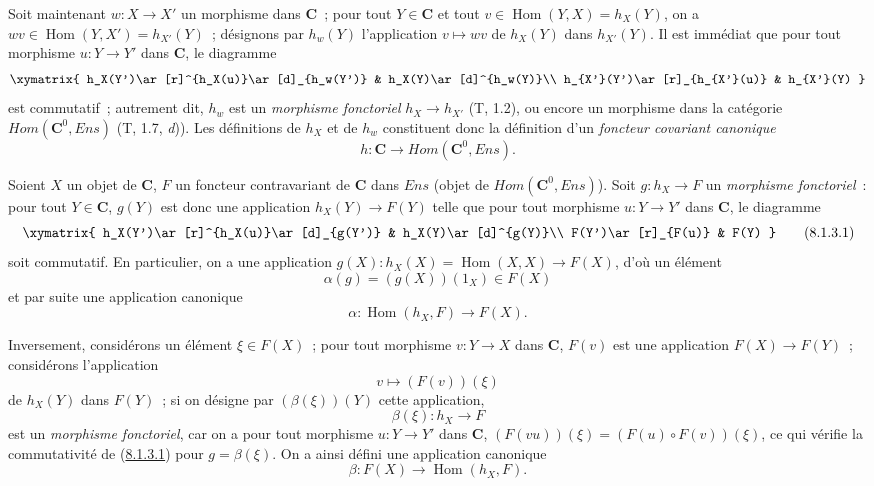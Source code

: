\begin{env}[8.1.2]
\label{0.8.1.2-fr}
Soit maintenant $w:X\to X'$ un morphisme dans $\boldsymbol{C}$~; pour tout $Y\in\boldsymbol{C}$ et
tout $v\in\operatorname{Hom}(Y,X)=h_X(Y)$, on a
$wv\in\operatorname{Hom}(Y,X')=h_{X'}(Y)$~; désignons par $h_w(Y)$
l'application $v\mapsto wv$ de $h_X(Y)$ dans $h_{X'}(Y)$. Il est immédiat
que pour tout morphisme $u:Y\to Y'$ dans $\boldsymbol{C}$, le diagramme
\[
  \xymatrix{
    h_X(Y')\ar[r]^{h_X(u)}\ar[d]_{h_w(Y')} &
    h_X(Y)\ar[d]^{h_w(Y)}\\
    h_{X'}(Y')\ar[r]_{h_{X'}(u)} &
    h_{X'}(Y)
  }
\]
est commutatif~; autrement dit, $h_w$ est un \emph{morphisme fonctoriel}
$h_X\to h_{X'}$ (T, 1.2), ou encore un morphisme dans la catégorie
$\boldsymbol{\mathit{Hom}}(\boldsymbol{C}^0,\boldsymbol{\mathit{Ens}})$ (T, 1.7, \textit{d})). Les définitions de
$h_X$ et de $h_w$ constituent donc la définition d'un \emph{foncteur
covariant canonique}
\[
  h:\boldsymbol{C}\to\boldsymbol{\mathit{Hom}}(\boldsymbol{C}^0,\boldsymbol{\mathit{Ens}}).
  \tag{8.1.2.1}
\]
\end{env}

\begin{env}[8.1.3]
\label{0.8.1.3-fr}
Soient $X$ un objet de $\boldsymbol{C}$, $F$ un foncteur contravariant de $\boldsymbol{C}$ dans
$\boldsymbol{\mathit{Ens}}$ (objet de $\boldsymbol{\mathit{Hom}}(\boldsymbol{C}^0,\boldsymbol{\mathit{Ens}})$). Soit
$g:h_X\to F$ un \emph{morphisme fonctoriel}~: pour tout $Y\in\boldsymbol{C}$,
$g(Y)$ est donc une application $h_X(Y)\to F(Y)$ telle que pour tout morphisme
$u:Y\to Y'$ dans $\boldsymbol{C}$, le diagramme
\[
  \xymatrix{
    h_X(Y')\ar[r]^{h_X(u)}\ar[d]_{g(Y')} &
    h_X(Y)\ar[d]^{g(Y)}\\
    F(Y')\ar[r]_{F(u)} & F(Y)
  }
  \tag{8.1.3.1}\label{0.8.1.3.1-fr}
\]
soit commutatif. En particulier, on a une application
$g(X):h_X(X)=\operatorname{Hom}(X,X)\to F(X)$, d'où un élément
\[
  \alpha(g)=(g(X))(1_X)\in F(X)
  \tag{8.1.3.2}
\]
et par suite une application canonique
\[
  \alpha:\operatorname{Hom}(h_X,F)\to F(X).
  \tag{8.1.3.3}
\]

Inversement, considérons un élément $\xi\in F(X)$~; pour tout morphisme
$v:Y\to X$ dans $\boldsymbol{C}$, $F(v)$ est une application $F(X)\to F(Y)$~;
considérons l'application
\[
  v\mapsto(F(v))(\xi)
  \tag{8.1.3.4}
\]
de $h_X(Y)$ dans $F(Y)$~; si on désigne par $(\beta(\xi))(Y)$ cette
application,
\[
  \beta(\xi):h_X\to F
  \tag{8.1.3.5}
\]
est un \emph{morphisme fonctoriel}, car on a pour tout morphisme
$u:Y\to Y'$ dans $\boldsymbol{C}$,
$(F(vu))(\xi)=(F(u)\circ F(v))(\xi)$, ce qui vérifie la commutativité de
(\hyperref[0.8.1.3.1-fr]{8.1.3.1}) pour $g=\beta(\xi)$. On a ainsi défini
une application canonique
\[
  \beta:F(X)\to\operatorname{Hom}(h_X,F).
  \tag{8.1.3.6}
\]
\end{env}

